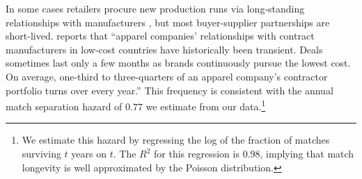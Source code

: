 \documentclass[12pt]{article} \usepackage{amsmath,amssymb,amsthm,geometry,graphicx,setspace,algorithm,algpseudocode,float}
\newcommand{\quotes}[1]{``#1''}
\begin{document}
In some cases retailers procure new production runs via long-standing
relationships with manufacturers \citep{CahalMacchiavelloNogueras2020}, but most buyer-supplier partnerships are short-lived. \citet{terry2008} reports that \quotes{apparel companies' relationships with contract manufacturers in low-cost countries have historically been transient. Deals sometimes last only a few months as
brands continuously pursue the lowest cost. On average, one-third to
three-quarters of an apparel company's contractor portfolio turns over every
year.} This frequency is consistent with the annual match separation hazard of $0.77$ we estimate from our data.\footnote{%
We estimate this hazard by regressing the log of the fraction of matches surviving $t$ years on $t$. The $R^2$ for this regression is $0.98$, implying that match longevity is well approximated by the Poisson distribution.\medskip
}
\end{document}
